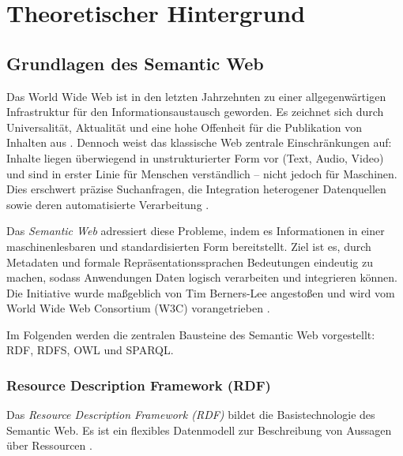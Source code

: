 \chapter{Theoretischer Hintergrund}
\label{sec:Theoretischer-Hintergrund}

\section{Grundlagen des Semantic Web}
\label{sec:Grundlagen-Semantic-Web}

Das World Wide Web ist in den letzten Jahrzehnten zu einer allgegenwärtigen Infrastruktur für den Informationsaustausch geworden. Es zeichnet sich durch Universalität, Aktualität und eine hohe Offenheit für die Publikation von Inhalten aus \cite{hitzler2008semantic}. Dennoch weist das klassische Web zentrale Einschränkungen auf: Inhalte liegen überwiegend in unstrukturierter Form vor (Text, Audio, Video) und sind in erster Linie für Menschen verständlich – nicht jedoch für Maschinen. Dies erschwert präzise Suchanfragen, die Integration heterogener Datenquellen sowie deren automatisierte Verarbeitung \cite{antoniou2008primer}.  

Das \textit{Semantic Web} adressiert diese Probleme, indem es Informationen in einer maschinenlesbaren und standardisierten Form bereitstellt. Ziel ist es, durch Metadaten und formale Repräsentationssprachen Bedeutungen eindeutig zu machen, sodass Anwendungen Daten logisch verarbeiten und integrieren können. Die Initiative wurde maßgeblich von Tim Berners-Lee angestoßen und wird vom World Wide Web Consortium (W3C) vorangetrieben \cite{bernerslee2001semantic}.  

Im Folgenden werden die zentralen Bausteine des Semantic Web vorgestellt: RDF, RDFS, OWL und SPARQL.  

\subsection{Resource Description Framework (RDF)}

Das \textit{Resource Description Framework (RDF)} bildet die Basistechnologie des Semantic Web. Es ist ein flexibles Datenmodell zur Beschreibung von Aussagen über Ressourcen \cite{w3c_rdf_primer}.  

